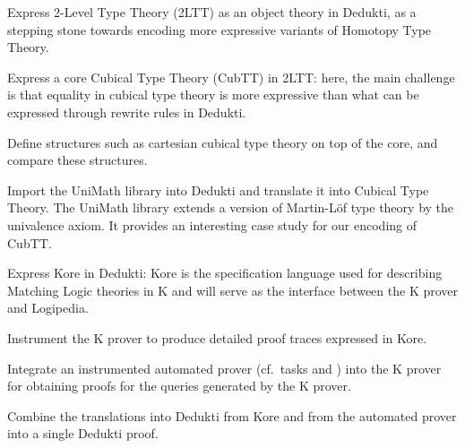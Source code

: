 \begin{workpackage}
\begin{tasklist}
\begin{task}[id=hott,
  title=Express Cubical Type Theory in Dedukti,
  shorttitle=CuTT,
  lead=Inr, %
  InrRM=42, %
  BirRM=3,  %
  LeeRM=3,  %
  wphases=1-48,
  ]
  \vspace{-5mm}
  \begin{compactitem}
  \item Express 2-Level Type Theory (2LTT) as an object theory in Dedukti, as
    a stepping stone towards encoding more expressive variants of Homotopy Type
    Theory.
  \item Express a core Cubical Type Theory (CubTT) in 2LTT: here, the main challenge is
    that equality in cubical type theory is more expressive than what can be
    expressed through rewrite rules in Dedukti.
  \item Define structures such as cartesian cubical type theory on top of the
    core, and compare these structures.
  \item Import the UniMath library into Dedukti and translate it into Cubical
    Type Theory. The UniMath library extends a version of
    Martin-Löf type theory by the univalence axiom. It provides an interesting
    case study for our encoding of CubTT.
  \end{compactitem}
\end{task}

\begin{task}[id=matching,
  title=Express Matching Logic in Dedukti and instrument the K prover,
  shorttitle=K,
  lead=Ias,
  IasRM=5,
  RunRM=7,
  wphases=1-42,
  ]
  \vspace{-5mm}
  \begin{compactitem}
  \item Express Kore in Dedukti: Kore is the specification language used for
    describing Matching Logic theories in K and will serve as the interface
    between the K prover and Logipedia.
  \item Instrument the K prover to produce detailed proof traces expressed in
    Kore.
  \item Integrate an instrumented automated prover (cf.\ tasks
     and ) into
    the K prover for obtaining proofs for the queries generated by the K prover.
  \item Combine the translations into Dedukti from Kore and from the automated
    prover into a single Dedukti proof.
  \end{compactitem}
\end{task}


\end{tasklist}
\end{workpackage}
